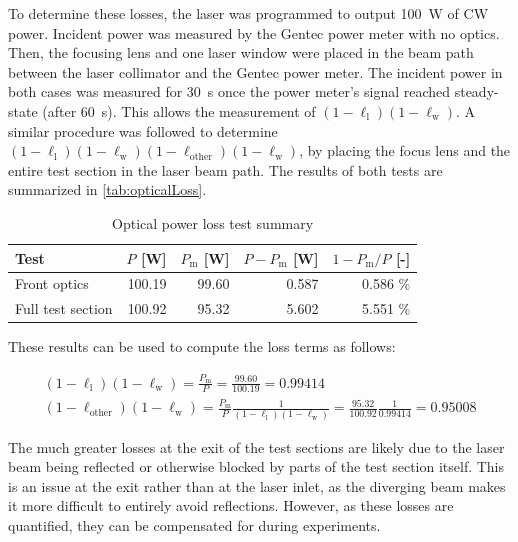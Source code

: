                 To determine these losses, the laser was programmed to output \qty{100}{W} of CW power. Incident power was measured by the Gentec power meter with no optics. Then, the focusing lens and one laser window were placed in the beam path between the laser collimator and the Gentec power meter. The incident power in both cases was measured for 30~s once the power meter's signal reached steady-state (after 60~s). This allows the measurement of $(1-\ell_\mathrm{l})(1-\ell_\mathrm{w})$. A similar procedure was followed to determine $(1-\ell_\mathrm{l})(1-\ell_\mathrm{w})(1-\ell_\mathrm{other})(1-\ell_\mathrm{w})$, by placing the focus lens and the entire test section in the laser beam path. The results of both tests are summarized in \autoref{tab:opticalLoss}.

                \begin{table}[h]
                    \centering
                    \caption{Optical power loss test summary}
                    \label{tab:opticalLoss}
                    \begin{tabular}{lrrrr}
                        \toprule
                        \textbf{Test}        & \textbf{$P$ [W]}   & \textbf{$P_\mathrm{m}$ [W]}    & \textbf{$P-P_\mathrm{m}$ [W]}  & \textbf{$1-P_\mathrm{m}/P$ [-]} \\
                        \midrule
                        Front optics    & 100.19    & 99.60 & 0.587  & 0.586 \% \\
                        Full test section    & 100.92    & 95.32 & 5.602  & 5.551 \% \\
                        \bottomrule
                    \end{tabular}
                \end{table}

                These results can be used to compute the loss terms as follows:

                \begin{gather*}
                    (1-\ell_\mathrm{l})(1-\ell_\mathrm{w}) = \frac{P_\mathrm{m}}{P} = \frac{99.60}{100.19} = 0.99414 \\
                    (1-\ell_\mathrm{other})(1-\ell_\mathrm{w}) = \frac{P_\mathrm{m}}{P}\frac{1}{(1-\ell_\mathrm{l})(1-\ell_\mathrm{w})} = \frac{95.32}{100.92}\frac{1}{0.99414} = 0.95008
                \end{gather*}
                
                The much greater losses at the exit of the test sections are likely due to the laser beam being reflected or otherwise blocked by parts of the test section itself. This is an issue at the exit rather than at the laser inlet, as the diverging beam makes it more difficult to entirely avoid reflections. However, as these losses are quantified, they can be compensated for during experiments.

